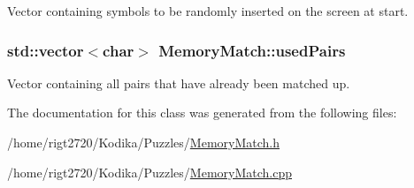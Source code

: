 Vector containing symbols to be randomly inserted on the screen at start. 

\hypertarget{classMemoryMatch_adcb66679aaceb1414fe023d065863d2f}{
\subsubsection[{used\-Pairs}]{\setlength{\rightskip}{0pt plus 5cm}std\-::vector$<$char$>$ Memory\-Match\-::used\-Pairs\hspace{0.3cm}{\ttfamily [private]}}}\label{classMemoryMatch_adcb66679aaceb1414fe023d065863d2f}


Vector containing all pairs that have already been matched up. 



The documentation for this class was generated from the following files\-:\begin{DoxyCompactItemize}
\item 
/home/rigt2720/\-Kodika/\-Puzzles/\hyperlink{MemoryMatch_8h}{Memory\-Match.\-h}\item 
/home/rigt2720/\-Kodika/\-Puzzles/\hyperlink{MemoryMatch_8cpp}{Memory\-Match.\-cpp}\end{DoxyCompactItemize}
